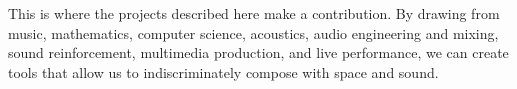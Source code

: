 This is where the projects described here make a contribution.  By
drawing from music, mathematics, computer science, acoustics, audio
engineering and mixing, sound reinforcement, multimedia production,
and live performance, we can create tools that allow us to
indiscriminately compose with space and sound.

